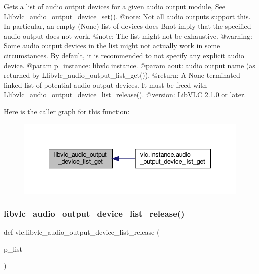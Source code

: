 \begin{DoxyVerb}Gets a list of audio output devices for a given audio output module,
See L{libvlc_audio_output_device_set}().
@note: Not all audio outputs support this. In particular, an empty (None)
list of devices does B{not} imply that the specified audio output does
not work.
@note: The list might not be exhaustive.
@warning: Some audio output devices in the list might not actually work in
some circumstances. By default, it is recommended to not specify any
explicit audio device.
@param p_instance: libvlc instance.
@param aout: audio output name (as returned by L{libvlc_audio_output_list_get}()).
@return: A None-terminated linked list of potential audio output devices. It must be freed with L{libvlc_audio_output_device_list_release}().
@version: LibVLC 2.1.0 or later.
\end{DoxyVerb}
 Here is the caller graph for this function\+:
\nopagebreak
\begin{figure}[H]
\begin{center}
\leavevmode
\includegraphics[width=335pt]{namespacevlc_a398beca7c466c6dee8cf8f97dec6664e_icgraph}
\end{center}
\end{figure}
\mbox{\label{namespacevlc_a0bab07db85d9932daaa7f9bd017702eb}} 
\subsubsection{\texorpdfstring{libvlc\+\_\+audio\+\_\+output\+\_\+device\+\_\+list\+\_\+release()}{libvlc\_audio\_output\_device\_list\_release()}}
{\footnotesize\ttfamily def vlc.\+libvlc\+\_\+audio\+\_\+output\+\_\+device\+\_\+list\+\_\+release (\begin{DoxyParamCaption}\item[{}]{p\+\_\+list }\end{DoxyParamCaption})}

